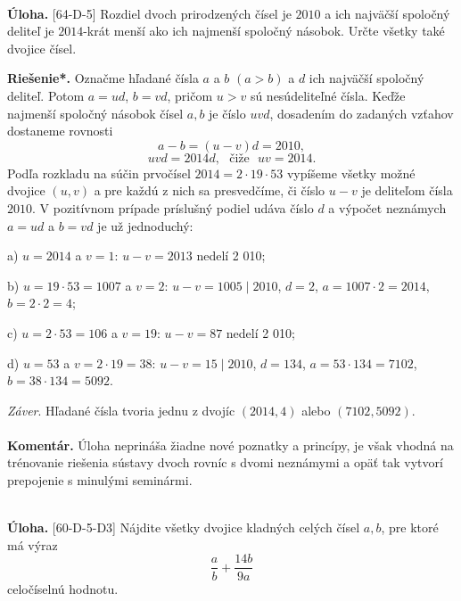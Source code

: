 \documentclass[11pt,a4paper,oneside,final]{book}
\newcommand{\kom}{\textbf{Komentár.} }
\newcommand{\ul}{\textbf{Úloha.} }
\newcommand{\rieh}{\textbf{Riešenie*.} }
\begin{document}
\\
\begin{tcolorbox}[breakable,notitle,boxrule=0pt,colback=light-gray,colframe=light-gray]\ul [64-D-5]
Rozdiel dvoch prirodzených čísel je $2010$ a ich najväčší spoločný deliteľ je $2014$-krát menší ako ich najmenší spoločný násobok. Určte všetky také dvojice čísel.

\end{tcolorbox}

\rieh Označme hľadané čísla $a$ a $b$ $(a > b)$ a $d$ ich najväčší spoločný deliteľ. Potom $a = ud$, $b = vd$, pričom $u > v$ sú nesúdeliteľné čísla. Keďže najmenší spoločný násobok čísel $a, b$ je číslo $uvd$, dosadením do zadaných vzťahov dostaneme rovnosti
$$ a - b = (u - v)d = 2 010,$$
$$uvd = 2 014d, \ \ \ \text{čiže} \ \ \  uv = 2 014.$$
Podľa rozkladu na súčin prvočísel $2 014 = 2\cdot19\cdot53$ vypíšeme všetky možné dvojice $(u, v)$ a pre každú z nich sa presvedčíme, či číslo $u- v$ je deliteľom čísla $2010$. V pozitívnom prípade príslušný podiel udáva číslo $d$ a výpočet neznámych $a = ud$ a $b = vd$ je už jednoduchý:

a) $u = 2 014$ a $v = 1$: $u - v = 2 013$ nedelí 2 010;

b) $u = 19 \cdot 53 = 1 007$ a $v = 2$: $u - v = 1 005 \mid 2 010$, $d = 2$, $a = 1 007 \cdot 2 = 2 014$, $b = 2 \cdot 2 = 4$;

c) $u = 2 \cdot 53 = 106$ a $v = 19$: $u - v = 87$ nedelí 2 010;

d) $u = 53$ a $v = 2 \cdot 19 = 38$: $u - v= 15 \mid 2010$, $d = 134$, $a = 53 \cdot 134 = 7 102$, $b = 38 \cdot 134 = 5 092$.

\textit{Záver}. Hľadané čísla tvoria jednu z dvojíc $(2014, 4)$ alebo $(7 102, 5 092)$.\\
\\
\kom Úloha neprináša žiadne nové poznatky a princípy, je však vhodná na trénovanie riešenia sústavy dvoch rovníc s dvomi neznámymi a opäť tak vytvorí prepojenie s minulými seminármi.\\
\\
\begin{tcolorbox}[breakable,notitle,boxrule=0pt,colback=light-gray,colframe=light-gray]\ul [60-D-5-D3] Nájdite všetky dvojice kladných celých čísel $a, b$, pre ktoré má výraz
$$\frac{a}{b}+\frac{14b}{9a}$$
celočíselnú hodnotu.

\end{tcolorbox}
\end{document}
